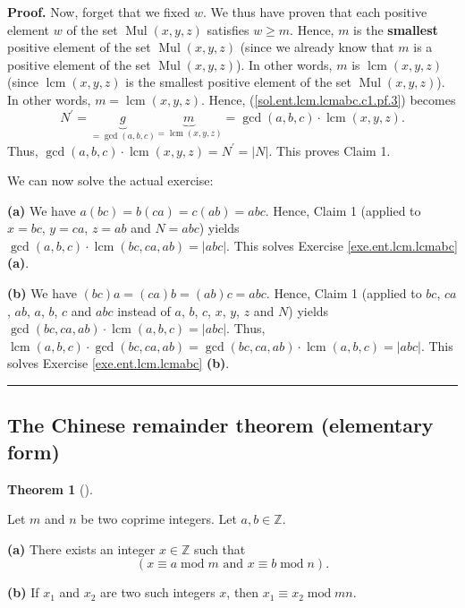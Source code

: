 \documentclass[numbers=enddot,12pt,final,onecolumn,notitlepage]{scrartcl}%
\newcounter{exer}
\numberwithin{exer}{subsection}
\theoremstyle{definition}
\newtheorem{theo}{Theorem}[subsection]
\newenvironment{theorem}[1][]
{\begin{theo}[#1]\begin{leftbar}}
{\end{leftbar}\end{theo}}
\newenvironment{fineprint}{\begin{small}}{\end{small}}
\newenvironment{proof}[1][Proof]{\noindent\textbf{#1.} }{\ \rule{0.5em}{0.5em}}
\begin{document}
\begin{fineprint}
\begin{proof}
Now, forget that we fixed $w$. We thus have proven that each positive element
$w$ of the set $\operatorname*{Mul}\left(  x,y,z\right)  $ satisfies $w\geq
m$. Hence, $m$ is the \textbf{smallest} positive element of the set
$\operatorname*{Mul}\left(  x,y,z\right)  $ (since we already know that $m$ is
a positive element of the set $\operatorname*{Mul}\left(  x,y,z\right)  $). In
other words, $m$ is $\operatorname{lcm}\left(  x,y,z\right)  $ (since
$\operatorname{lcm}\left(  x,y,z\right)  $ is the smallest positive element of
the set $\operatorname*{Mul}\left(  x,y,z\right)  $). In other words,
$m=\operatorname{lcm}\left(  x,y,z\right)  $. Hence,
(\ref{sol.ent.lcm.lcmabc.c1.pf.3}) becomes%
\[
N^{\prime}=\underbrace{g}_{=\gcd\left(  a,b,c\right)  }\underbrace{m}%
_{=\operatorname{lcm}\left(  x,y,z\right)  }=\gcd\left(  a,b,c\right)
\cdot\operatorname{lcm}\left(  x,y,z\right)  .
\]
Thus, $\gcd\left(  a,b,c\right)  \cdot\operatorname{lcm}\left(  x,y,z\right)
=N^{\prime}=\left\vert N\right\vert $. This proves Claim 1.

We can now solve the actual exercise:

\textbf{(a)} We have $a\left(  bc\right)  =b\left(  ca\right)  =c\left(
ab\right)  =abc$. Hence, Claim 1 (applied to $x=bc$, $y=ca$, $z=ab$ and
$N=abc$) yields $\gcd\left(  a,b,c\right)  \cdot\operatorname{lcm}\left(
bc,ca,ab\right)  =\left\vert abc\right\vert $. This solves Exercise
\ref{exe.ent.lcm.lcmabc} \textbf{(a)}.

\textbf{(b)} We have $\left(  bc\right)  a=\left(  ca\right)  b=\left(
ab\right)  c=abc$. Hence, Claim 1 (applied to $bc$, $ca$, $ab$, $a$, $b$, $c$
and $abc$ instead of $a$, $b$, $c$, $x$, $y$, $z$ and $N$) yields $\gcd\left(
bc,ca,ab\right)  \cdot\operatorname{lcm}\left(  a,b,c\right)  =\left\vert
abc\right\vert $. Thus, $\operatorname{lcm}\left(  a,b,c\right)  \cdot
\gcd\left(  bc,ca,ab\right)  =\gcd\left(  bc,ca,ab\right)  \cdot
\operatorname{lcm}\left(  a,b,c\right)  =\left\vert abc\right\vert $. This
solves Exercise \ref{exe.ent.lcm.lcmabc} \textbf{(b)}.
\end{proof}
\end{fineprint}

\subsection{The Chinese remainder theorem (elementary form)}

\begin{theorem}
\label{thm.ent.crt1}Let $m$ and $n$ be two coprime integers. Let
$a,b\in\mathbb{Z}$.

\textbf{(a)} There exists an integer $x\in\mathbb{Z}$ such that%
\[
\left(  x\equiv a\operatorname{mod}m\text{ and }x\equiv b\operatorname{mod}%
n\right)  .
\]


\textbf{(b)} If $x_{1}$ and $x_{2}$ are two such integers $x$, then
$x_{1}\equiv x_{2}\operatorname{mod}mn$.
\end{theorem}
\end{document}
